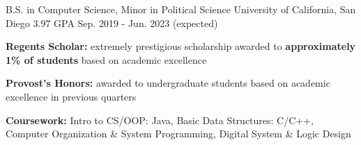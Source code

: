 

\begin{cventries}

    \cventry
    {B.S. in Computer Science, Minor in Political Science} %
    {University of California, San Diego} %
    {3.97 GPA} %
    {Sep. 2019 - Jun. 2023 (expected)} %
    {
      \begin{cvitems} %
        \item {\textbf{Regents Scholar:} extremely prestigious scholarship awarded to \textbf{approximately 1\% of students} based on academic excellence}
        \item {\textbf{Provost's Honors:} awarded to undergraduate students based on academic excellence in previous quarters}
        \item {\textbf{Coursework:} Intro to CS/OOP: Java, Basic Data Structures: C/C++, Computer Organization \& System Programming, Digital System \& Logic Design}
      \end{cvitems}
    }

\end{cventries}
